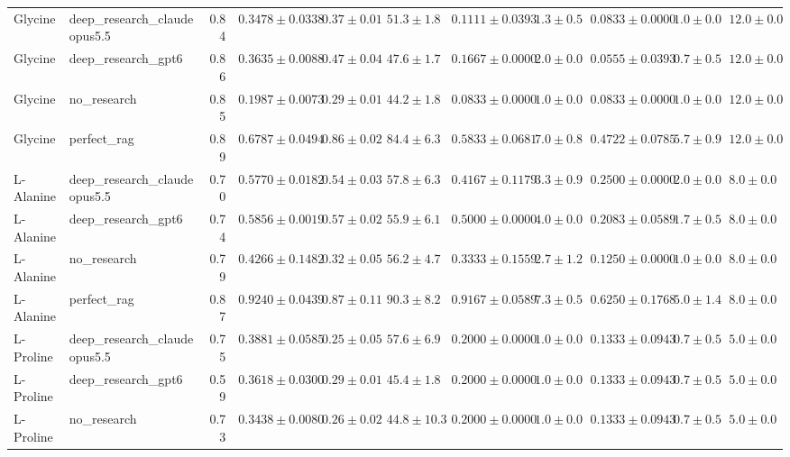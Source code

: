 \begin{table}[htbp]
\begin{tabular}{llrrrrrrrrr}
\midrule
Glycine & deep_research_claudeopus5.5 & 0.84 & $0.3478 \pm 0.0338$ & $0.37 \pm 0.01$ & $51.3 \pm 1.8$ & $0.1111 \pm 0.0393$ & $1.3 \pm 0.5$ & $0.0833 \pm 0.0000$ & $1.0 \pm 0.0$ & $12.0 \pm 0.0$ \\
Glycine & deep_research_gpt6 & 0.86 & $0.3635 \pm 0.0088$ & $0.47 \pm 0.04$ & $47.6 \pm 1.7$ & $0.1667 \pm 0.0000$ & $2.0 \pm 0.0$ & $0.0555 \pm 0.0393$ & $0.7 \pm 0.5$ & $12.0 \pm 0.0$ \\
Glycine & no_research & 0.85 & \cellcolor{red!25}$0.1987 \pm 0.0073$ & $0.29 \pm 0.01$ & $44.2 \pm 1.8$ & $0.0833 \pm 0.0000$ & $1.0 \pm 0.0$ & $0.0833 \pm 0.0000$ & $1.0 \pm 0.0$ & $12.0 \pm 0.0$ \\
Glycine & perfect_rag & 0.89 & \cellcolor{green!25}$0.6787 \pm 0.0494$ & $0.86 \pm 0.02$ & $84.4 \pm 6.3$ & $0.5833 \pm 0.0681$ & $7.0 \pm 0.8$ & $0.4722 \pm 0.0785$ & $5.7 \pm 0.9$ & $12.0 \pm 0.0$ \\
\midrule
L-Alanine & deep_research_claudeopus5.5 & 0.70 & $0.5770 \pm 0.0182$ & $0.54 \pm 0.03$ & $57.8 \pm 6.3$ & $0.4167 \pm 0.1179$ & $3.3 \pm 0.9$ & $0.2500 \pm 0.0000$ & $2.0 \pm 0.0$ & $8.0 \pm 0.0$ \\
L-Alanine & deep_research_gpt6 & 0.74 & $0.5856 \pm 0.0019$ & $0.57 \pm 0.02$ & $55.9 \pm 6.1$ & $0.5000 \pm 0.0000$ & $4.0 \pm 0.0$ & $0.2083 \pm 0.0589$ & $1.7 \pm 0.5$ & $8.0 \pm 0.0$ \\
L-Alanine & no_research & 0.79 & \cellcolor{red!25}$0.4266 \pm 0.1482$ & $0.32 \pm 0.05$ & $56.2 \pm 4.7$ & $0.3333 \pm 0.1559$ & $2.7 \pm 1.2$ & $0.1250 \pm 0.0000$ & $1.0 \pm 0.0$ & $8.0 \pm 0.0$ \\
L-Alanine & perfect_rag & 0.87 & \cellcolor{green!25}$0.9240 \pm 0.0439$ & $0.87 \pm 0.11$ & $90.3 \pm 8.2$ & $0.9167 \pm 0.0589$ & $7.3 \pm 0.5$ & $0.6250 \pm 0.1768$ & $5.0 \pm 1.4$ & $8.0 \pm 0.0$ \\
\midrule
L-Proline & deep_research_claudeopus5.5 & 0.75 & $0.3881 \pm 0.0585$ & $0.25 \pm 0.05$ & $57.6 \pm 6.9$ & $0.2000 \pm 0.0000$ & $1.0 \pm 0.0$ & $0.1333 \pm 0.0943$ & $0.7 \pm 0.5$ & $5.0 \pm 0.0$ \\
L-Proline & deep_research_gpt6 & 0.59 & $0.3618 \pm 0.0300$ & $0.29 \pm 0.01$ & $45.4 \pm 1.8$ & $0.2000 \pm 0.0000$ & $1.0 \pm 0.0$ & $0.1333 \pm 0.0943$ & $0.7 \pm 0.5$ & $5.0 \pm 0.0$ \\
L-Proline & no_research & 0.73 & \cellcolor{red!25}$0.3438 \pm 0.0080$ & $0.26 \pm 0.02$ & $44.8 \pm 10.3$ & $0.2000 \pm 0.0000$ & $1.0 \pm 0.0$ & $0.1333 \pm 0.0943$ & $0.7 \pm 0.5$ & $5.0 \pm 0.0$ \\

\end{tabular}
\end{table}
